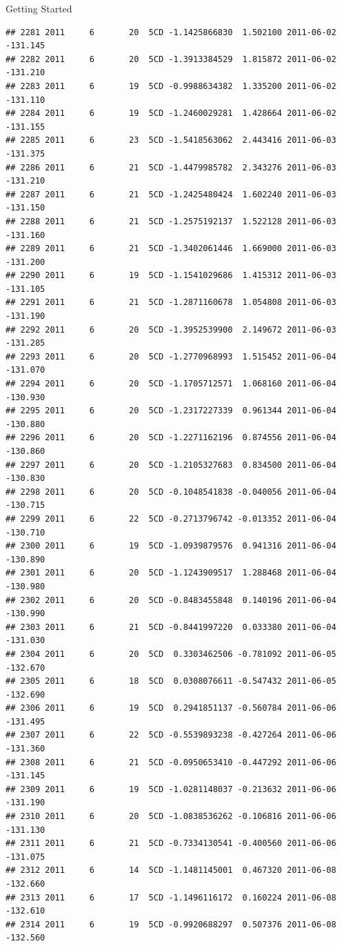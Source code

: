 \documentclass[
  ignorenonframetext,
]{beamer}
\begin{document}
\begin{frame}[fragile]{Getting Started}
\begin{verbatim}
## 2281 2011     6       20  5CD -1.1425866830  1.502100 2011-06-02 -131.145
## 2282 2011     6       20  5CD -1.3913384529  1.815872 2011-06-02 -131.210
## 2283 2011     6       19  5CD -0.9988634382  1.335200 2011-06-02 -131.110
## 2284 2011     6       19  5CD -1.2460029281  1.428664 2011-06-02 -131.155
## 2285 2011     6       23  5CD -1.5418563062  2.443416 2011-06-03 -131.375
## 2286 2011     6       21  5CD -1.4479985782  2.343276 2011-06-03 -131.210
## 2287 2011     6       21  5CD -1.2425480424  1.602240 2011-06-03 -131.150
## 2288 2011     6       21  5CD -1.2575192137  1.522128 2011-06-03 -131.160
## 2289 2011     6       21  5CD -1.3402061446  1.669000 2011-06-03 -131.200
## 2290 2011     6       19  5CD -1.1541029686  1.415312 2011-06-03 -131.105
## 2291 2011     6       21  5CD -1.2871160678  1.054808 2011-06-03 -131.190
## 2292 2011     6       20  5CD -1.3952539900  2.149672 2011-06-03 -131.285
## 2293 2011     6       20  5CD -1.2770968993  1.515452 2011-06-04 -131.070
## 2294 2011     6       20  5CD -1.1705712571  1.068160 2011-06-04 -130.930
## 2295 2011     6       20  5CD -1.2317227339  0.961344 2011-06-04 -130.880
## 2296 2011     6       20  5CD -1.2271162196  0.874556 2011-06-04 -130.860
## 2297 2011     6       20  5CD -1.2105327683  0.834500 2011-06-04 -130.830
## 2298 2011     6       20  5CD -0.1048541838 -0.040056 2011-06-04 -130.715
## 2299 2011     6       22  5CD -0.2713796742 -0.013352 2011-06-04 -130.710
## 2300 2011     6       19  5CD -1.0939879576  0.941316 2011-06-04 -130.890
## 2301 2011     6       20  5CD -1.1243909517  1.288468 2011-06-04 -130.980
## 2302 2011     6       20  5CD -0.8483455848  0.140196 2011-06-04 -130.990
## 2303 2011     6       21  5CD -0.8441997220  0.033380 2011-06-04 -131.030
## 2304 2011     6       20  5CD  0.3303462506 -0.781092 2011-06-05 -132.670
## 2305 2011     6       18  5CD  0.0308076611 -0.547432 2011-06-05 -132.690
## 2306 2011     6       19  5CD  0.2941851137 -0.560784 2011-06-06 -131.495
## 2307 2011     6       22  5CD -0.5539893238 -0.427264 2011-06-06 -131.360
## 2308 2011     6       21  5CD -0.0950653410 -0.447292 2011-06-06 -131.145
## 2309 2011     6       19  5CD -1.0281148037 -0.213632 2011-06-06 -131.190
## 2310 2011     6       20  5CD -1.0838536262 -0.106816 2011-06-06 -131.130
## 2311 2011     6       21  5CD -0.7334130541 -0.400560 2011-06-06 -131.075
## 2312 2011     6       14  5CD -1.1481145001  0.467320 2011-06-08 -132.660
## 2313 2011     6       17  5CD -1.1496116172  0.160224 2011-06-08 -132.610
## 2314 2011     6       19  5CD -0.9920688297  0.507376 2011-06-08 -132.560

\end{verbatim}
\end{frame}
\end{document}
